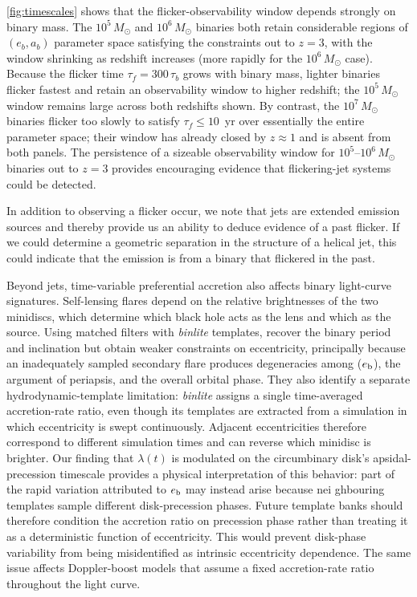 \documentclass[fleqn,usenatbib]{mnras}
\begin{document}
\autoref{fig:timescales} shows that the flicker-observability window depends strongly on binary mass. The $10^5\,M_\odot$ and $10^6\,M_\odot$ binaries both retain considerable regions of $(e_b, a_b)$ parameter space satisfying the constraints out to $z = 3$, with the window shrinking as redshift increases (more rapidly for the $10^6\,M_\odot$ case). Because the flicker time $\tau_f = 300\,\tau_b$ grows with binary mass, lighter binaries flicker fastest and retain an observability window to higher redshift; the $10^5\,M_\odot$ window remains large across both redshifts shown. By contrast, the $10^7\,M_\odot$ binaries flicker too slowly to satisfy $\tau_f \le 10$~yr over essentially the entire parameter space; their window has already closed by $z \approx 1$ and is absent from both panels. The persistence of a sizeable observability window for $10^5$--$10^6\,M_\odot$ binaries out to $z = 3$ provides encouraging evidence that flickering-jet systems could be detected.

In addition to observing a flicker occur, we note that jets are extended emission sources and thereby provide us an ability to deduce evidence of a past flicker. If we could determine a geometric separation in the structure of a helical jet, this could indicate that the emission is from a binary that flickered in the past. 

Beyond jets, time-variable preferential accretion also affects binary light-curve signatures. Self-lensing flares depend on the relative brightnesses of the two minidiscs, which determine which black hole acts as the lens and which as the source. Using matched filters with \textit{binlite} templates, \citet{Park2026SLF5} recover the binary period and inclination but obtain weaker constraints on eccentricity, principally because an inadequately sampled secondary flare produces degeneracies among ($e_{\rm b}$), the argument of periapsis, and the overall orbital phase. They also identify a separate hydrodynamic-template limitation: \textit{binlite} assigns a single time-averaged accretion-rate ratio, even though its templates are extracted from a simulation in which eccentricity is swept continuously. Adjacent eccentricities therefore correspond to different simulation times and can reverse which minidisc is brighter. Our finding that $\lambda(t)$ is modulated on the circumbinary disk’s apsidal-precession timescale provides a physical interpretation of this behavior: part of the rapid variation attributed to $e_{\rm b}$ may instead arise because nei        ghbouring templates sample different disk-precession phases. Future template banks should therefore condition the accretion ratio on precession phase rather than treating it as a deterministic function of eccentricity. This would prevent disk-phase variability from being misidentified as intrinsic eccentricity dependence. The same issue affects Doppler-boost models \citep{dorazio_spikey, charisi_doppler} that assume a fixed accretion-rate ratio throughout the light curve.
 
\end{document}
